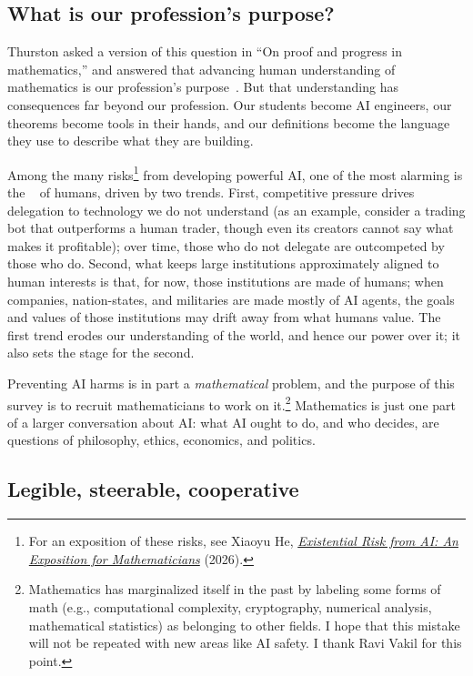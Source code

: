 \subsection{What is our profession's purpose?}

Thurston asked a version of this question in ``On proof and progress in mathematics,'' and answered that advancing human understanding of mathematics is our profession's purpose~\cite{thurston1994}. But that understanding has consequences far beyond our profession. Our students become AI engineers, our theorems become tools in their hands, and our definitions become the language they use to describe what they are building.

Among the many risks\footnote{For an exposition of these risks, see Xiaoyu He, \href{https://alkjash.github.io/ai-risk/}{\emph{Existential Risk from AI: An Exposition for Mathematicians}} (2026).} from developing powerful AI, one of the most alarming is the ~\cite{kulveit2025} of humans, driven by two trends. First, competitive pressure drives delegation to technology we do not understand (as an example, consider a trading bot that outperforms a human trader, though even its creators cannot say what makes it profitable); over time, those who do not delegate are outcompeted by those who do. Second, what keeps large institutions approximately aligned to human interests is that, for now, those institutions are made of humans; when companies, nation-states, and militaries are made mostly of AI agents, the goals and values of those institutions may drift away from what humans value. The first trend erodes our understanding of the world, and hence our power over it; it also sets the stage for the second.

Preventing AI harms is in part a \emph{mathematical} problem, and the purpose of this survey is to recruit mathematicians to work on it.\footnote{Mathematics has marginalized itself in the past by labeling some forms of math (e.g., computational complexity, cryptography, numerical analysis, mathematical statistics) as belonging to other fields. I hope that this mistake will not be repeated with new areas like AI safety. I thank Ravi Vakil for this point.}  
Mathematics is just one part of a larger conversation about AI: what AI ought to do, and who decides, are questions of philosophy, ethics, economics, and politics. 

\subsection{Legible, steerable, cooperative}
\label{sec:three-properties}

